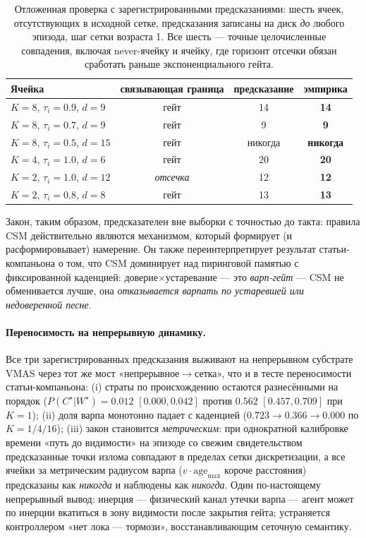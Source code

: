 \documentclass{article}
\newcommand{\wstar}{W^{\star}}
\newcommand{\cstar}{C^{\star}}
\begin{document}
\begin{table}[h]
\centering
\caption{Отложенная проверка с зарегистрированными предсказаниями:
шесть ячеек, отсутствующих в исходной сетке, предсказания записаны на
диск \emph{до} любого эпизода, шаг сетки возраста 1. Все шесть ---
точные целочисленные совпадения, включая never-ячейку и ячейку, где
горизонт отсечки обязан сработать раньше экспоненциального гейта.}
\label{p2:tab:holdout}
\small
\begin{tabular}{lccc}
\toprule
Ячейка & связывающая граница & предсказание & эмпирика \\
\midrule
$K{=}8$, $\tau_i{=}0.9$, $d{=}9$  & гейт    & 14 & \textbf{14} \\
$K{=}8$, $\tau_i{=}0.7$, $d{=}9$  & гейт    & 9  & \textbf{9}  \\
$K{=}8$, $\tau_i{=}0.5$, $d{=}15$ & гейт    & никогда & \textbf{никогда} \\
$K{=}4$, $\tau_i{=}1.0$, $d{=}6$  & гейт    & 20 & \textbf{20} \\
$K{=}2$, $\tau_i{=}1.0$, $d{=}12$ & \emph{отсечка} & 12 & \textbf{12} \\
$K{=}2$, $\tau_i{=}0.8$, $d{=}8$  & гейт    & 13 & \textbf{13} \\
\bottomrule
\end{tabular}
\end{table}

Закон, таким образом, предсказателен вне выборки с точностью до
такта: правила CSM действительно являются механизмом, который
формирует (и расформировывает) намерение. Он также переинтерпретирует
результат статьи-компаньона о том, что CSM доминирует над пиринговой
памятью с фиксированной каденцией: доверие$\times$устаревание --- это
\emph{варп-гейт} --- CSM не обменивается лучше, она \emph{отказывается
варпать по устаревшей или недоверенной песне}.

\paragraph{Переносимость на непрерывную динамику.} Все три
зарегистрированных предсказания выживают на непрерывном субстрате
VMAS через тот же мост «непрерывное$\to$сетка», что и в тесте
переносимости статьи-компаньона: (i) страты по происхождению остаются
разнесёнными на порядок ($P(\cstar|\wstar)=0.012$ $[0.000,0.042]$
против $0.562$ $[0.457,0.709]$ при $K{=}1$); (ii) доля варпа
монотонно падает с каденцией ($0.723\to0.366\to0.000$ по $K{=}1/4/16$);
(iii) закон становится \emph{метрическим}: при однократной калибровке
времени «путь до видимости» на эпизоде со свежим свидетельством
предсказанные точки излома совпадают в пределах сетки дискретизации,
а все ячейки за метрическим радиусом варпа
($v\cdot\mathrm{age}_{\max}$ короче расстояния) предсказаны как
\emph{никогда} и наблюдены как \emph{никогда}. Один по-настоящему
непрерывный вывод: инерция --- физический канал утечки варпа --- агент
может по инерции вкатиться в зону видимости после закрытия гейта;
устраняется контроллером «нет лока --- тормози», восстанавливающим
сеточную семантику.
\end{document}
